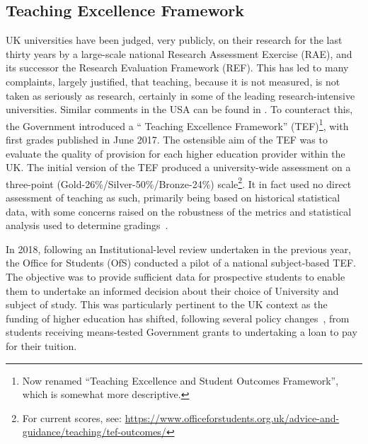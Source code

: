 \documentclass[conference]{IEEEtran}
\begin{document}
\subsection{Teaching Excellence Framework}

UK universities have been judged, very publicly, on their research for
the last thirty years by a large-scale national Research Assessment
Exercise (RAE), and its successor the Research Evaluation Framework
(REF). This has led to many complaints, largely justified, that
teaching, because it is not measured, is not taken as seriously as
research, certainly in some of the leading research-intensive
universities. Similar comments in the USA can be found in
\cite{Campbelletal2018a}. To counteract this, the Government
introduced a `` Teaching Excellence Framework'' (TEF)\footnote{Now
renamed ``Teaching Excellence and Student Outcomes Framework'', which
is somewhat more descriptive.}, with first grades published in June
2017. The ostensible aim of the TEF was to evaluate the quality of
provision for each higher education provider within the UK. The
initial version of the TEF produced a university-wide assessment on a
three-point (Gold-26\%/Silver-50\%/Bronze-24\%) scale\footnote{For
current scores, see:
\url{https://www.officeforstudents.org.uk/advice-and-guidance/teaching/tef-outcomes/}}. It
in fact used no direct assessment of teaching as such, primarily being
based on historical statistical data, with some concerns raised on the
robustness of the metrics and statistical analysis used to determine
gradings~\cite{gillard:2017}.

In 2018, following an Institutional-level review undertaken in the
previous year, the Office for Students (OfS) conducted a pilot of a
national subject-based TEF. The objective was to provide sufficient
data for prospective students to enable them to undertake an informed
decision about their choice of University and subject of study. This
was particularly pertinent to the UK context as the funding of higher
education has shifted, following several policy
changes~\cite{BIS2010a}, from students receiving means-tested
Government grants to undertaking a loan to pay for their tuition.
\end{document}
